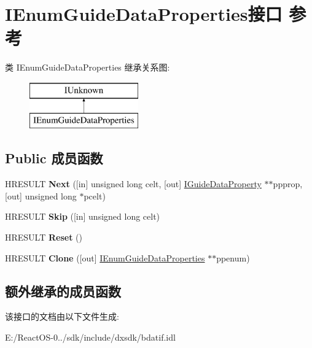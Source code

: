 \hypertarget{interface_i_enum_guide_data_properties}{}\section{I\+Enum\+Guide\+Data\+Properties接口 参考}
\label{interface_i_enum_guide_data_properties}
类 I\+Enum\+Guide\+Data\+Properties 继承关系图\+:\begin{figure}[H]
\begin{center}
\leavevmode
\includegraphics[height=2.000000cm]{interface_i_enum_guide_data_properties}
\end{center}
\end{figure}
\subsection*{Public 成员函数}
\begin{DoxyCompactItemize}
\item 
\mbox{\label{interface_i_enum_guide_data_properties_a513b81eec062dfa167c21b0e38351601}} 
H\+R\+E\+S\+U\+LT {\bfseries Next} (\mbox{[}in\mbox{]} unsigned long celt, \mbox{[}out\mbox{]} \hyperlink{interface_i_guide_data_property}{I\+Guide\+Data\+Property} $\ast$$\ast$ppprop, \mbox{[}out\mbox{]} unsigned long $\ast$pcelt)
\item 
\mbox{\label{interface_i_enum_guide_data_properties_ab2d2ffd3b49ea1cb20e5dcbb168b8cd2}} 
H\+R\+E\+S\+U\+LT {\bfseries Skip} (\mbox{[}in\mbox{]} unsigned long celt)
\item 
\mbox{\label{interface_i_enum_guide_data_properties_afde074c323625cae836ab2b4654207e3}} 
H\+R\+E\+S\+U\+LT {\bfseries Reset} ()
\item 
\mbox{\label{interface_i_enum_guide_data_properties_a627e18a8c21c450d59ebeef7d702603b}} 
H\+R\+E\+S\+U\+LT {\bfseries Clone} (\mbox{[}out\mbox{]} \hyperlink{interface_i_enum_guide_data_properties}{I\+Enum\+Guide\+Data\+Properties} $\ast$$\ast$ppenum)
\end{DoxyCompactItemize}
\subsection*{额外继承的成员函数}


该接口的文档由以下文件生成\+:\begin{DoxyCompactItemize}
\item 
E\+:/\+React\+O\+S-\/0../sdk/include/dxsdk/bdatif.\+idl\end{DoxyCompactItemize}

